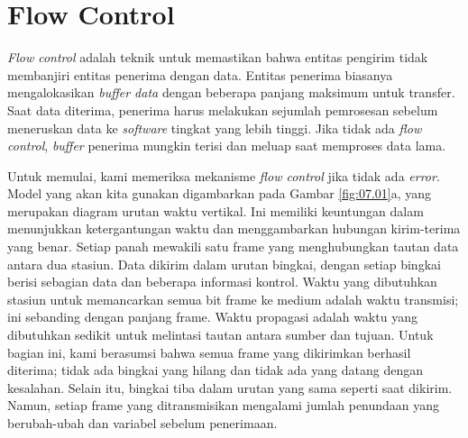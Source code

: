 \section{Flow Control}

\textit{Flow control} adalah teknik untuk memastikan bahwa entitas pengirim tidak membanjiri entitas penerima dengan data. Entitas penerima biasanya mengalokasikan \textit{buffer data} dengan beberapa panjang maksimum untuk transfer. Saat data diterima, penerima harus melakukan sejumlah pemrosesan sebelum meneruskan data ke \textit{software} tingkat yang lebih tinggi. Jika tidak ada \textit{flow control}, \textit{buffer} penerima mungkin terisi dan meluap saat memproses data lama.

Untuk memulai, kami memeriksa mekanisme \textit{flow control} jika tidak ada \textit{error}. Model yang akan kita gunakan digambarkan pada Gambar \ref{fig:07.01}a, yang merupakan diagram urutan waktu vertikal. Ini memiliki keuntungan dalam menunjukkan ketergantungan waktu dan menggambarkan hubungan kirim-terima yang benar. Setiap panah mewakili satu frame yang menghubungkan tautan data antara dua stasiun. Data dikirim dalam urutan bingkai, dengan setiap bingkai berisi sebagian data dan beberapa informasi kontrol. Waktu yang dibutuhkan stasiun untuk memancarkan semua bit frame ke medium adalah waktu transmisi; ini sebanding dengan panjang frame. Waktu propagasi adalah waktu yang dibutuhkan sedikit untuk melintasi tautan antara sumber dan tujuan. Untuk bagian ini, kami berasumsi bahwa semua frame yang dikirimkan berhasil diterima; tidak ada bingkai yang hilang dan tidak ada yang datang dengan kesalahan. Selain itu, bingkai tiba dalam urutan yang sama seperti saat dikirim. Namun, setiap frame yang ditransmisikan mengalami jumlah penundaan yang berubah-ubah dan variabel sebelum penerimaan.\footnotemark


